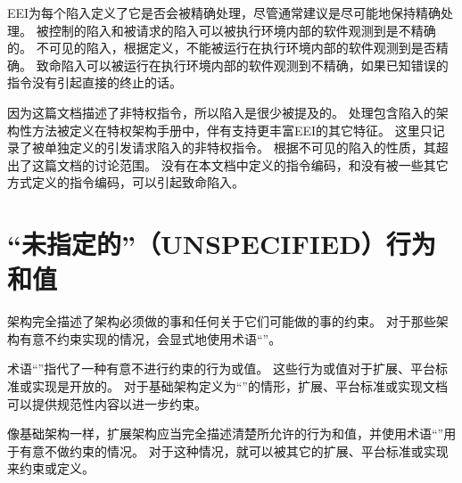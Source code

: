 EEI为每个陷入定义了它是否会被精确处理，尽管通常建议是尽可能地保持精确处理。
被控制的陷入和被请求的陷入可以被执行环境内部的软件观测到是不精确的。
不可见的陷入，根据定义，不能被运行在执行环境内部的软件观测到是否精确。
致命陷入可以被运行在执行环境内部的软件观测到不精确，如果已知错误的指令没有引起直接的终止的话。

因为这篇文档描述了非特权指令，所以陷入是很少被提及的。
处理包含陷入的架构性方法被定义在特权架构手册中，伴有支持更丰富EEI的其它特征。
这里只记录了被单独定义的引发请求陷入的非特权指令。
根据不可见的陷入的性质，其超出了这篇文档的讨论范围。
没有在本文档中定义的指令编码，和没有被一些其它方式定义的指令编码，可以引起致命陷入。

\section{“未指定的”（UNSPECIFIED）行为和值}

架构完全描述了架构必须做的事和任何关于它们可能做的事的约束。
对于那些架构有意不约束实现的情况，会显式地使用术语“\unspecified”。

术语“\unspecified”指代了一种有意不进行约束的行为或值。
这些行为或值对于扩展、平台标准或实现是开放的。
对于基础架构定义为“\unspecified”的情形，扩展、平台标准或实现文档可以提供规范性内容以进一步约束。

像基础架构一样，扩展架构应当完全描述清楚所允许的行为和值，并使用术语“\unspecified”用于有意不做约束的情况。
对于这种情况，就可以被其它的扩展、平台标准或实现来约束或定义。
